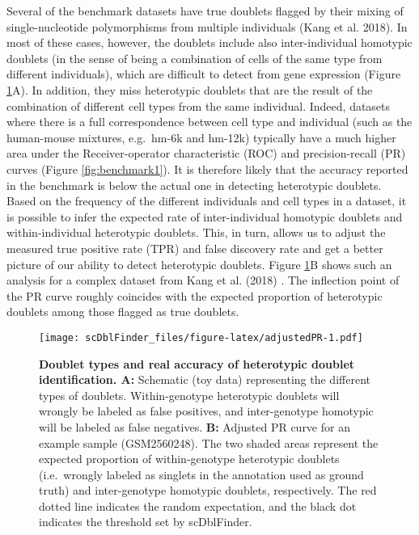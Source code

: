 \documentclass[10pt,a4paper,twocolumn]{article}
\begin{document}
Several of the benchmark datasets have true doublets flagged by their mixing of single-nucleotide polymorphisms from multiple individuals (Kang et al. 2018).
In most of these cases, however, the doublets include also inter-individual homotypic doublets (in the sense of being a combination of cells of the same type from different individuals), which are difficult to detect from gene expression (Figure \ref{fig:adjustedPR}A).
In addition, they miss heterotypic doublets that are the result of the combination of different cell types from the same individual.
Indeed, datasets where there is a full correspondence between cell type and individual (such as the human-mouse mixtures, e.g.~hm-6k and hm-12k) typically have a much higher area under the Receiver-operator characteristic (ROC) and precision-recall (PR) curves (Figure \ref{fig:benchmark1}).
It is therefore likely that the accuracy reported in the benchmark is below the actual one in detecting heterotypic doublets.
Based on the frequency of the different individuals and cell types in a dataset, it is possible to infer the expected rate of inter-individual homotypic doublets and within-individual heterotypic doublets.
This, in turn, allows us to adjust the measured true positive rate (TPR) and false discovery rate and get a better picture of our ability to detect heterotypic doublets.
Figure \ref{fig:adjustedPR}B shows such an analysis for a complex dataset from Kang et al. (2018) .
The inflection point of the PR curve roughly coincides with the expected proportion of heterotypic doublets among those flagged as true doublets.

\begin{figure}
\centering
\texttt{[image: scDblFinder\_files/figure-latex/adjustedPR-1.pdf]}
\caption{\label{fig:adjustedPR}\textbf{Doublet types and real accuracy of heterotypic doublet identification. A:} Schematic (toy data) representing the different types of doublets. Within-genotype heterotypic doublets will wrongly be labeled as false positives, and inter-genotype homotypic will be labeled as false negatives. \textbf{B:} Adjusted PR curve for an example sample (GSM2560248). The two shaded areas represent the expected proportion of within-genotype heterotypic doublets (i.e.~wrongly labeled as singlets in the annotation used as ground truth) and inter-genotype homotypic doublets, respectively. The red dotted line indicates the random expectation, and the black dot indicates the threshold set by scDblFinder.}
\end{figure}
\end{document}
